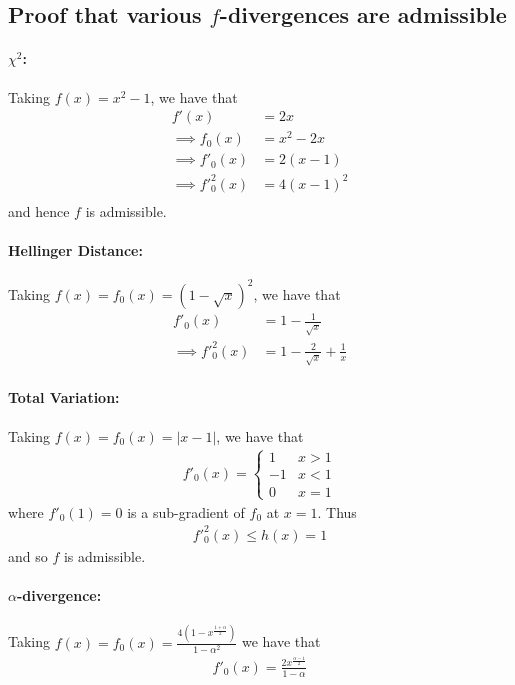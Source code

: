\subsection{Proof that various $f$-divergences are admissible}


\paragraph{$\chi^2$:}
Taking $f(x) = x^2 - 1$, we have that
\begin{align*}
    f'(x) &= 2x \\
    \implies f_0(x) &= x^2 - 2x \\
    \implies f'_0(x) &= 2(x - 1) \\
    \implies f'^2_0(x) &= 4(x-1)^2 \\
\end{align*}
and hence $f$ is admissible.

\paragraph{Hellinger Distance:}
Taking $f(x) = f_0(x) = (1-\sqrt{x})^2$, we have that
\begin{align*}
    f'_0(x) &= 1- \frac{1}{\sqrt{x}} \\
    \implies f'^2_0(x) &= 1- \frac{2}{\sqrt{x}} + \frac{1}{x}
\end{align*}

\paragraph{Total Variation:}
Taking $f(x) = f_0(x) = |x-1|$, we have that 
\begin{align*}
    f'_0(x) = \begin{cases} 1 & x>1 \\ -1 & x<1 \\ 
    0 & x=1
    \end{cases}
\end{align*}
where $f'_0(1)=0$ is a sub-gradient of $f_0$ at $x=1$. 
Thus
\begin{align*}
    f'^2_0(x) \leq h(x) = 1
\end{align*}
and so $f$ is admissible.

\paragraph{$\alpha$-divergence:}

Taking $f(x) = f_0(x) = \frac{4 \left(1 - x^{\frac{1+\alpha}{2}}\right)}{1-\alpha^2}$ we have that
\begin{align*}
    f'_0(x) = \frac{2 x^{\frac{\alpha - 1}{2}}}{1-\alpha}
\end{align*}
